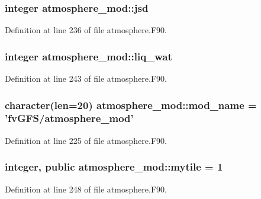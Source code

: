 \subsubsection[{jsd}]{\setlength{\rightskip}{0pt plus 5cm}integer atmosphere\-\_\-mod\-::jsd\hspace{0.3cm}{\ttfamily [private]}}\label{classatmosphere__mod_a972cd4fc5737c35941feca9dbb6e46a8}


Definition at line 236 of file atmosphere.\-F90.

\subsubsection[{liq\-\_\-wat}]{\setlength{\rightskip}{0pt plus 5cm}integer atmosphere\-\_\-mod\-::liq\-\_\-wat\hspace{0.3cm}{\ttfamily [private]}}\label{classatmosphere__mod_a41f34859d8c8fd6e84cd71aabd6d2a25}


Definition at line 243 of file atmosphere.\-F90.

\subsubsection[{mod\-\_\-name}]{\setlength{\rightskip}{0pt plus 5cm}character(len=20) atmosphere\-\_\-mod\-::mod\-\_\-name = 'fv\-G\-F\-S/{\bf atmosphere\-\_\-mod}'\hspace{0.3cm}{\ttfamily [private]}}\label{classatmosphere__mod_ad4f4fdf067d2b71eb5764b34cea8cb92}


Definition at line 225 of file atmosphere.\-F90.

\subsubsection[{mytile}]{\setlength{\rightskip}{0pt plus 5cm}integer, public atmosphere\-\_\-mod\-::mytile = 1}\label{classatmosphere__mod_a72d23c8d327e3066174b6e43f5697494}


Definition at line 248 of file atmosphere.\-F90.

